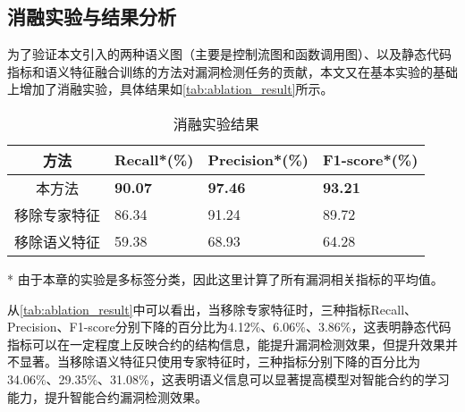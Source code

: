 \subsection{消融实验与结果分析}
\label{sec:消融实验与结果分析}
为了验证本文引入的两种语义图（主要是控制流图和函数调用图）、以及静态代码指标和语义特征融合训练的方法对漏洞检测任务的贡献，本文又在基本实验的基础上增加了消融实验，具体结果如\autoref{tab:ablation_result}所示。
\begin{table}[htbp]
    \caption{\label{tab:ablation_result}消融实验结果}
    \small
    \begin{threeparttable}{
    \renewcommand{\arraystretch}{1.5}
    \begin{tabularx}{\linewidth}{cX<{\centering}X<{\centering}X<{\centering}}
        \hline
        方法 & Recall*(\%) & Precision*(\%) & F1-score*(\%) \\
        \hline
        本方法 & \textbf{90.07} & \textbf{97.46} & \textbf{93.21} \\
        移除专家特征 & 86.34 & 91.24 & 89.72 \\
        移除语义特征 & 59.38 & 68.93 & 64.28 \\
        \hline
    \end{tabularx}
    }
    \begin{tablenotes}
        \footnotesize
        \item[*] 由于本章的实验是多标签分类，因此这里计算了所有漏洞相关指标的平均值。
    \end{tablenotes}
\end{threeparttable}
\end{table}
从\autoref{tab:ablation_result}中可以看出，当移除专家特征时，三种指标Recall、Precision、F1-score分别下降的百分比为4.12\%、6.06\%、3.86\%，这表明静态代码指标可以在一定程度上反映合约的结构信息，能提升漏洞检测效果，但提升效果并不显著。当移除语义特征只使用专家特征时，三种指标分别下降的百分比为34.06\%、29.35\%、31.08\%，这表明语义信息可以显著提高模型对智能合约的学习能力，提升智能合约漏洞检测效果。





